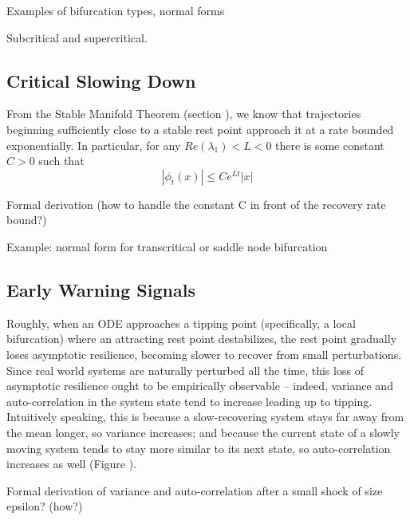 Examples of bifurcation types, normal forms

Subcritical and supercritical.

\subsection{Critical Slowing Down}

From the Stable Manifold Theorem (section ), we know that trajectories beginning sufficiently close to a stable rest point approach it at a rate bounded exponentially. In particular, for any $Re(\lambda_1) < L < 0$ there is some constant $C >0$ such that
$$|\phi_t(x)| \leq Ce^{Lt}|x|$$


Formal derivation (how to handle the constant C in front of the recovery rate bound?)

Example: normal form for transcritical or saddle node bifurcation

\subsection{Early Warning Signals}

Roughly, when an ODE approaches a tipping point (specifically, a local bifurcation) where an attracting rest point destabilizes, the rest point gradually loses asymptotic resilience, becoming slower to recover from small perturbations. Since real world systems are naturally perturbed all the time, this loss of asymptotic resilience ought to be empirically observable -- indeed, variance and auto-correlation in the system state tend to increase leading up to tipping. Intuitively speaking, this is because a slow-recovering system stays far away from the mean longer, so variance increases; and because the current state of a slowly moving system tends to stay more similar to its next state, so auto-correlation increases as well (Figure ).


Formal derivation of variance and auto-correlation after a small shock of size epsilon? (how?)

	
